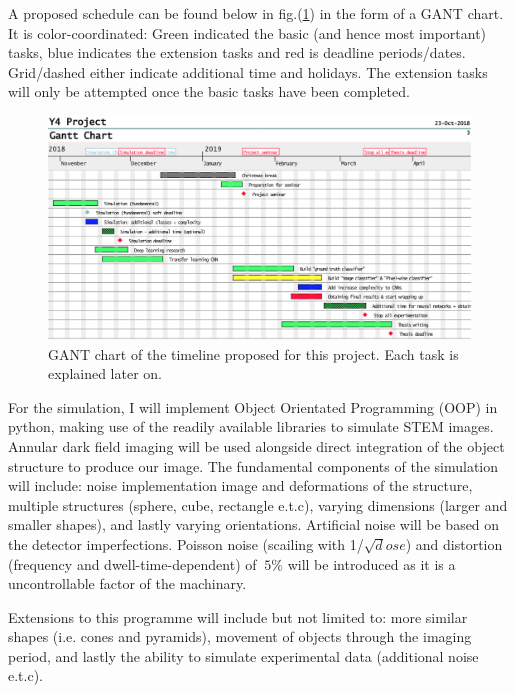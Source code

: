 \documentclass{cookedoc}
\begin{document}
	A proposed schedule can be found below in fig.(\ref{GANT}) in the form of a GANT chart. It is color-coordinated: Green indicated the basic (and hence most important) tasks, blue indicates the extension tasks and red is deadline periods/dates. Grid/dashed either indicate additional time and holidays. The extension tasks will only be attempted once the basic tasks have been completed. 
	
	\begin{figure} [H]
		\centering
		\includegraphics[width=\linewidth]{gant2.png}
		\caption{GANT chart of the timeline proposed for this project. Each task is explained later on.}
		\label{GANT}
	\end{figure} 
	
	For the simulation, I will implement Object Orientated Programming (OOP) in python, making use of the readily available libraries to simulate STEM images. Annular dark field imaging will be used alongside direct integration of the object structure to produce our image. The fundamental components of the simulation will include: noise implementation image and deformations of the structure, multiple structures (sphere, cube, rectangle e.t.c), varying dimensions (larger and smaller shapes), and lastly varying orientations. Artificial noise will be based on the detector imperfections. Poisson noise (scailing with 1/$\sqrt dose$) and distortion (frequency and dwell-time-dependent) of $~5\%$ will be introduced as it is a uncontrollable factor of the machinary. 
	
	 Extensions to this programme will include but not limited to: more similar shapes (i.e. cones and pyramids), movement of objects through the imaging period, and lastly the ability to simulate experimental data (additional noise e.t.c). 
	
\end{document}
